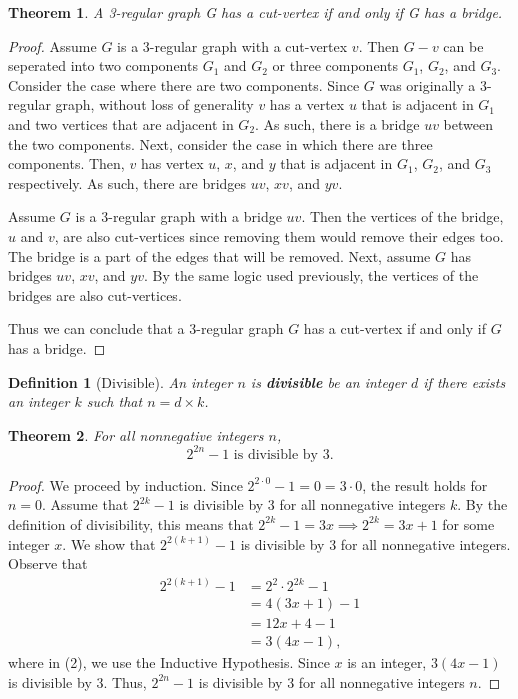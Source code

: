 \documentclass[11pt]{article}
\newtheorem{theorem}{Theorem}
\newtheorem{definition}{Definition}
\begin{document}
\newpage

\begin{theorem}
A 3-regular graph G has a cut-vertex if and only if G has a bridge.
\end{theorem}

\begin{proof}
Assume $G$ is a 3-regular graph with a cut-vertex $v$. Then $G-v$ can be seperated into two components $G_1$ and $G_2$ or three components $G_1$, $G_2$, and $G_3$. Consider the case where there are two components. Since $G$ was originally a 3-regular graph, without loss of generality $v$ has a vertex $u$ that is adjacent in $G_1$ and two vertices that are adjacent in $G_2$. As such, there is a bridge $uv$ between the two components. Next, consider the case in which there are  three components. Then, $v$ has vertex $u$, $x$, and $y$ that is adjacent in $G_1$, $G_2$, and $G_3$ respectively. As such, there are bridges $uv$, $xv$, and $yv$.

Assume $G$ is a 3-regular graph with a bridge $uv$. Then the vertices of the bridge, $u$ and $v$, are also cut-vertices since removing them would remove their edges too. The bridge is a part of the edges that will be removed. Next, assume $G$ has bridges $uv$, $xv$, and $yv$. By the same logic used previously, the vertices of the bridges are also cut-vertices.

Thus we can conclude that a 3-regular graph $G$ has a cut-vertex if and only if $G$ has a bridge.
\end{proof}

\newpage

\begin{definition}[Divisible]
	An integer $n$ is {\bf divisible} be an integer $d$ if there exists an integer $k$ such that $n=d\times k$.
\end{definition}

\begin{theorem}
	For all nonnegative integers $n$, 
	\[2^{2n}-1\text{ is divisible by }3.\]
\end{theorem}

\begin{proof}
	We proceed by induction. Since $2^{2\cdot0}-1=0=3\cdot0$, the result holds for $n=0$. Assume that $2^{2k}-1$ is divisible by 3 for all nonnegative integers $k$. By the definition of divisibility, this means that $2^{2k}-1=3x \implies 2^{2k}=3x+1$ for some integer $x$. We show that $2^{2(k+1)}-1$ is divisible by 3 for all nonnegative integers. Observe that 
	\begin{align}
		2^{2(k+1)}-1 &= 2^{2}\cdot2^{2k}-1 \\
		&= 4(3x+1)-1 \\
		&= 12x+4-1 \\
		&= 3(4x-1),
	\end{align}
	where in (2), we use the Inductive Hypothesis. Since $x$ is an integer, $3(4x-1)$ is divisible by $3$. Thus, $2^{2n}-1$ is divisible by 3 for all nonnegative integers $n$.
\end{proof}
\end{document}

